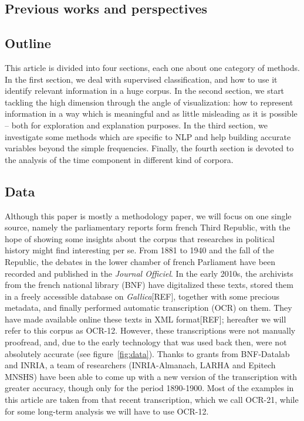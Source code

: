 \documentclass[a4paper,11pt]{article}
\begin{document}
\subsection{Previous works and perspectives}

\subsection{Outline}

This article is divided into four sections, each one about one category of methods. In the first section, we deal with supervised classification, and how to use it identify relevant information in a huge corpus. In the second section, we start tackling the high dimension through the angle of visualization: how to represent information in a way which is meaningful and as little misleading as it is possible -- both for exploration and explanation purposes. In the third section, we investigate some methods which are specific to NLP and help building accurate variables beyond the simple frequencies. Finally, the fourth section is devoted to the analysis of the time component in different kind of corpora. 


\subsection{Data}

Although this paper is mostly a methodology paper, we will focus on one single source, namely the parliamentary reports form french Third Republic, with the hope of showing some insights about the corpus that researches in political history might find interesting per se. From 1881 to 1940 and the fall of the Republic, the debates in the lower chamber of french Parliament have been recorded and published in the \textit{Journal Officiel}. In the early 2010s, the archivists from the french national library (BNF) have digitalized these texts, stored them in a freely accessible database on \textit{Gallica}[REF], together with some precious metadata, and finally performed automatic transcription (OCR) on them. They have made available online these texts in XML format[REF]; hereafter we will refer to this corpus as OCR-12. However, these transcriptions were not manually proofread, and, due to the early technology that was used back then, were not absolutely accurate (see figure~\ref{fig:data}). Thanks to grants from BNF-Datalab and INRIA, a team of researchers (INRIA-Almanach, LARHA and Epitech MNSHS) have been able to come up with a new version of the transcription with greater accuracy, though only for the period 1890-1900. Most of the examples in this article are taken from that recent transcription, which we call OCR-21, while for some long-term analysis we will have to use OCR-12.
\end{document}
